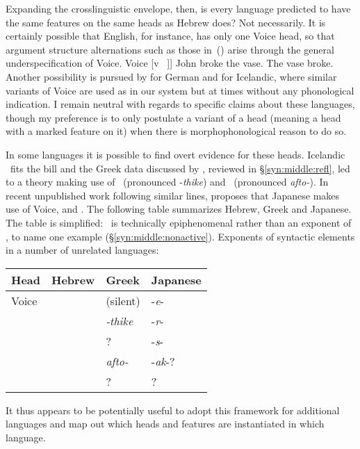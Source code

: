 Expanding the crosslinguistic envelope, then, is every language predicted to have the same features on the same heads as Hebrew does? Not necessarily. It is certainly possible that English, for instance, has only one Voice head, so that argument structure alternations such as those in~(\nextx) arise through the general underspecification of Voice. \pex {[}Voice [v ~\!]]
	\a John broke the vase.
	\a The vase broke.
\xe
Another possibility is pursued by \cite{schaefer08} for German and \cite{wood15springer} for Icelandic, where similar variants of Voice are used as in our system but at times without any phonological indication. I remain neutral with regards to specific claims about these languages, though my preference is to only postulate a variant of a head (meaning a head with a marked feature on it) when there is morphophonological reason to do so.

In some languages it is possible to find overt evidence for these heads. Icelandic \vz~fits the bill \citep{wood15springer} and the Greek data discussed by \cite{spathasetal15}, reviewed in \S\ref{syn:middle:refl}, led to a theory making use of \vz~(pronounced -\emph{thike}) and \va~(pronounced \emph{afto-}). In recent {unpublished }work following similar lines, \cite{oseki16nyu} proposes that Japanese makes use of Voice, {\vz} and \vd. The following table summarizes Hebrew, Greek and Japanese. The table is simplified: \tnif~is technically epiphenomenal rather than an exponent of \vz, to name one example{ (\S\ref{syn:middle:nonactive})}.
\ex\label{ex:heads-langs}Exponents of syntactic elements in a number of unrelated languages:\\
	\begin{tabular}{l|lll}
	Head 	& Hebrew 		& Greek  		& Japanese\\\hline
	Voice   & \tkal     & (silent)      & -\emph{e}-\\
	{\vz} 	& \tnif 	& \emph{-thike}	& -\emph{r}-\\
	{\vd}	& \thif		& ?		& -\emph{s}-\\
	{\va}	& \tpie		& \emph{afto-}	& -\emph{ak}-?\\
	{\pz}	& \tnif		& ?		& ?\\
	\end{tabular}
\xe
It thus appears to be potentially useful to adopt this framework for additional languages and map out which heads and features are instantiated in which language.

